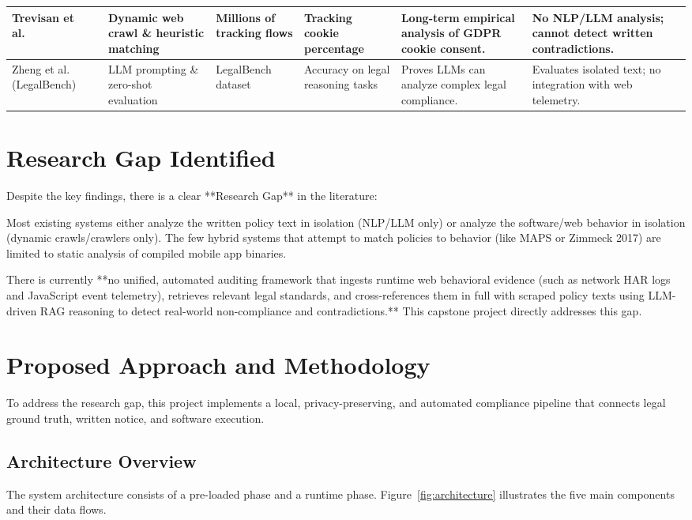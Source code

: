 \documentclass[11pt,a4paper]{article}
\begin{document}
\begin{table}[h]
\begin{tabular}{p{2.3cm}p{2.3cm}p{2.2cm}p{2.3cm}p{3cm}p{3.2cm}}
\hline
Trevisan et al.~\cite{trevisan-2019-cookies} & Dynamic web crawl \& heuristic matching & Millions of tracking flows & Tracking cookie percentage & Long-term empirical analysis of GDPR cookie consent. & No NLP/LLM analysis; cannot detect written contradictions. \\
\hline
Zheng et al. (LegalBench)~\cite{zheng-2025-legalbench} & LLM prompting \& zero-shot evaluation & LegalBench dataset & Accuracy on legal reasoning tasks & Proves LLMs can analyze complex legal compliance. & Evaluates isolated text; no integration with web telemetry. \\
\hline
\end{tabular}
\end{table}

\section{Research Gap Identified}
Despite the key findings, there is a clear **Research Gap** in the literature:

Most existing systems either analyze the written policy text in isolation (NLP/LLM only) or analyze the software/web behavior in isolation (dynamic crawls/crawlers only). The few hybrid systems that attempt to match policies to behavior (like MAPS or Zimmeck 2017) are limited to static analysis of compiled mobile app binaries.

There is currently **no unified, automated auditing framework that ingests runtime web behavioral evidence (such as network HAR logs and JavaScript event telemetry), retrieves relevant legal standards, and cross-references them in full with scraped policy texts using LLM-driven RAG reasoning to detect real-world non-compliance and contradictions.** This capstone project directly addresses this gap.

\section{Proposed Approach and Methodology}
To address the research gap, this project implements a local, privacy-preserving, and automated compliance pipeline that connects legal ground truth, written notice, and software execution.

\subsection{Architecture Overview}
The system architecture consists of a pre-loaded phase and a runtime phase. Figure~\ref{fig:architecture} illustrates the five main components and their data flows.
\end{document}
